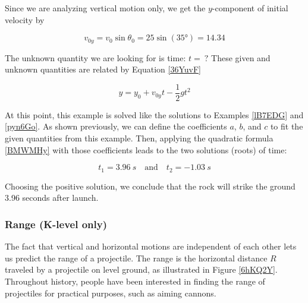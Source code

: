 \documentclass{article}
\begin{document}
\vspace{1em}

Since we are analyzing vertical motion only, we get the $y$-component of initial velocity by

\begin{equation*}
    v_{0y} = v_0 \sin{\theta_0} = 25 \sin{(\ang{35})} = 14.34
\end{equation*}

 The unknown quantity we are looking for is time: $t =\ ?$ These given and unknown quantities are related by Equation \eqref{36YuvF}

\begin{equation*}
    y = y_0 + v_{0y}t - \frac{1}{2} g t^2
\end{equation*}

At this point, this example is solved like the solutions to Examples \ref{lB7EDG} and \ref{pyn6Go}. As shown previously, we can define the coefficients $a$, $b$, and $c$ to fit the given quantities from this example. Then, applying the quadratic formula \eqref{BMWMHy} with those coefficients leads to the two solutions (roots) of time:

\begin{equation*}
    t_1 = \SI{3.96}{s} \quad \text{and} \quad t_2 = \SI{-1.03}{s}
\end{equation*}

Choosing the positive solution, we conclude that the rock will strike the ground 3.96 seconds after launch.

\subsubsection*{Range (K-level only)}

The fact that vertical and horizontal motions are independent of each other lets us predict the range of a projectile. The \gls{range} is the horizontal distance $R$ traveled by a projectile on level ground, as illustrated in Figure \ref{6hKQ2Y}. Throughout history, people have been interested in finding the range of projectiles for practical purposes, such as aiming cannons.
\end{document}
